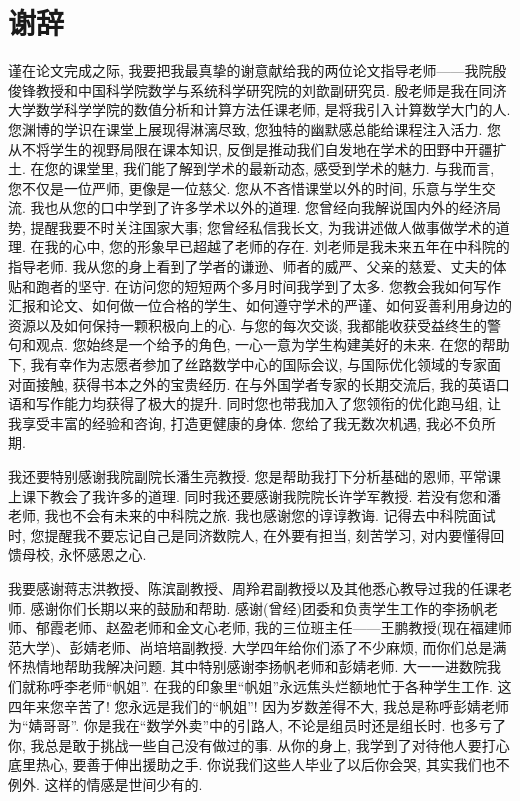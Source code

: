\section*{谢辞}
谨在论文完成之际, 我要把我最真挚的谢意献给我的两位论文指导老师——我院殷俊锋教授和中国科学院数学与系统科学研究院的刘歆副研究员. 殷老师是我在同济大学数学科学学院的数值分析和计算方法任课老师, 是将我引入计算数学大门的人. 您渊博的学识在课堂上展现得淋漓尽致, 您独特的幽默感总能给课程注入活力. 您从不将学生的视野局限在课本知识, 反倒是推动我们自发地在学术的田野中开疆扩土. 在您的课堂里, 我们能了解到学术的最新动态, 感受到学术的魅力. 与我而言, 您不仅是一位严师, 更像是一位慈父. 您从不吝惜课堂以外的时间, 乐意与学生交流. 我也从您的口中学到了许多学术以外的道理. 您曾经向我解说国内外的经济局势, 提醒我要不时关注国家大事; 您曾经私信我长文, 为我讲述做人做事做学术的道理. 在我的心中, 您的形象早已超越了老师的存在. 刘老师是我未来五年在中科院的指导老师. 我从您的身上看到了学者的谦逊、师者的威严、父亲的慈爱、丈夫的体贴和跑者的坚守. 在访问您的短短两个多月时间我学到了太多. 您教会我如何写作汇报和论文、如何做一位合格的学生、如何遵守学术的严谨、如何妥善利用身边的资源以及如何保持一颗积极向上的心. 与您的每次交谈, 我都能收获受益终生的警句和观点. 您始终是一个给予的角色, 一心一意为学生构建美好的未来. 在您的帮助下, 我有幸作为志愿者参加了丝路数学中心的国际会议, 与国际优化领域的专家面对面接触, 获得书本之外的宝贵经历. 在与外国学者专家的长期交流后, 我的英语口语和写作能力均获得了极大的提升. 同时您也带我加入了您领衔的优化跑马组, 让我享受丰富的经验和咨询, 打造更健康的身体. 您给了我无数次机遇, 我必不负所期.
\par 我还要特别感谢我院副院长潘生亮教授. 您是帮助我打下分析基础的恩师, 平常课上课下教会了我许多的道理. 同时我还要感谢我院院长许学军教授. 若没有您和潘老师, 我也不会有未来的中科院之旅. 我也感谢您的谆谆教诲. 记得去中科院面试时, 您提醒我不要忘记自己是同济数院人, 在外要有担当, 刻苦学习, 对内要懂得回馈母校, 永怀感恩之心. 
\par 我要感谢蒋志洪教授、陈滨副教授、周羚君副教授以及其他悉心教导过我的任课老师. 感谢你们长期以来的鼓励和帮助. 感谢(曾经)团委和负责学生工作的李扬帆老师、郁霞老师、赵盈老师和金文心老师, 我的三位班主任——王鹏教授(现在福建师范大学)、彭婧老师、尚培培副教授. 大学四年给你们添了不少麻烦, 而你们总是满怀热情地帮助我解决问题. 其中特别感谢李扬帆老师和彭婧老师. 大一一进数院我们就称呼李老师``帆姐''. 在我的印象里``帆姐''永远焦头烂额地忙于各种学生工作. 这四年来您辛苦了! 您永远是我们的``帆姐''! 因为岁数差得不大, 我总是称呼彭婧老师为``婧哥哥''. 你是我在``数学外卖''中的引路人, 不论是组员时还是组长时. 也多亏了你, 我总是敢于挑战一些自己没有做过的事. 从你的身上, 我学到了对待他人要打心底里热心, 要善于伸出援助之手. 你说我们这些人毕业了以后你会哭, 其实我们也不例外. 这样的情感是世间少有的.
